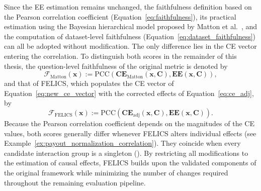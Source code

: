 Since the EE estimation remains unchanged, the faithfulness definition based on the Pearson correlation coefficient (Equation~\ref{eq:faithfulness}), its practical estimation using the Bayesian hierarchical model proposed by Matton et al.~\cite{mattonWalkTalkMeasuring2024}, and the computation of dataset-level faithfulness (Equation~\ref{eq:dataset_faithfulness}) can all be adopted without modification. The only difference lies in the CE vector entering the correlation. To distinguish both scores in the remainder of this thesis, the question-level faithfulness of the original metric is denoted by
\begin{equation}
	\label{eq:faithfulness_matton}
	\mathcal{F}_{\mathrm{Matton}}(\mathbf{x}) := \mathrm{PCC}\left(\mathbf{CE}_{\mathrm{Matton}}(\mathbf{x},\mathbf{C}),\mathbf{EE}(\mathbf{x},\mathbf{C})\right),
\end{equation}
and that of FELICS, which populates the CE vector of Equation~\ref{eq:new_ce_vector} with the corrected effects of Equation~\ref{eq:ce_adj}, by
\begin{equation}
	\label{eq:faithfulness_felics}
	\mathcal{F}_{\mathrm{FELICS}}(\mathbf{x}) := \mathrm{PCC}\left(\mathbf{CE}_{\mathrm{adj}}(\mathbf{x},\mathbf{C}),\mathbf{EE}(\mathbf{x},\mathbf{C})\right).
\end{equation}
Because the Pearson correlation coefficient depends on the magnitudes of the CE values, both scores generally differ whenever FELICS alters individual effects (see Example~\ref{ex:payout_normalization_correlation}). They coincide when every candidate interaction group is a singleton (). By restricting all modifications to the estimation of causal effects, FELICS builds upon the validated components of the original framework while minimizing the number of changes required throughout the remaining evaluation pipeline.

